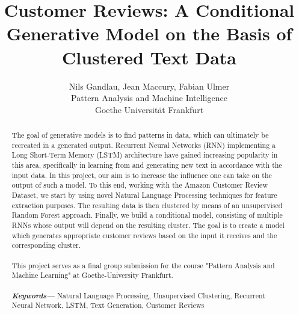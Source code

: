 \documentclass[]{report}
\title{Customer Reviews: A Conditional Generative Model on the Basis of Clustered Text Data}
\author{Nils Gandlau, Jean Maccury, Fabian Ulmer \\
		\small Pattern Analysis and Machine Intelligence \\
		\small Goethe Universität Frankfurt}
\providecommand{\keywords}[1]
{
	\small	
	\textbf{\textit{Keywords---}} #1
}
\begin{document}
\maketitle


\begin{abstract}
	The goal of generative models is to find patterns in data, which can ultimately be recreated in a generated output. Recurrent Neural Networks (RNN) implementing a Long Short-Term Memory (LSTM) architecture have gained increasing popularity in this area, specifically in learning from and generating new text in accordance with the input data. In this project, our aim is to increase the influence one can take on the output of such a model. To this end, working with the Amazon Customer Review Dataset, we start by using novel Natural Language Processing techniques for feature extraction purposes. The resulting data is then clustered by means of an unsupervised Random Forest approach. Finally, we build a conditional model, consisting of multiple RNNs whose output will depend on the resulting cluster. The goal is to create a model which generates appropriate customer reviews based on the input it receives and the corresponding cluster.   \\\\
	This project serves as a final group submission for the course "Pattern Analysis and Machine Learning" at Goethe-University Frankfurt. \\\\
	\keywords{Natural Language Processing, Unsupervised Clustering, Recurrent Neural Network, LSTM, Text Generation, Customer Reviews}	
\end{abstract}

\tableofcontents
\end{document}
